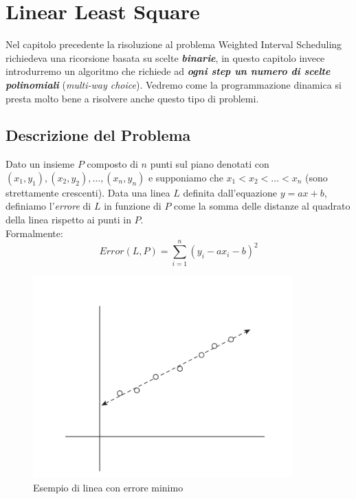 \chapter{Linear Least Square}

Nel capitolo precedente la risoluzione al problema Weighted Interval
Scheduling richiedeva una ricorsione basata su scelte
\textbf{\emph{binarie}}, in questo capitolo invece introdurremo un
algoritmo che richiede ad \textbf{\emph{ogni step un numero di scelte
    polinomiali}} (\emph{multi-way choice}). Vedremo come la programmazione
dinamica si presta molto bene a risolvere anche questo tipo di problemi.

\section{Descrizione del Problema}

\begin{myblockquote}
  Dato un insieme $P$ composto di $n$ punti sul piano denotati con \linebreak
  $(x_1, y_1), (x_2, y_2), \ldots, (x_n, y_n)$ e supponiamo che
  $x_1 < x_2 < \ldots < x_n$ (sono strettamente crescenti). Data una
  linea $L$ definita dall'equazione $y = ax + b$, definiamo
  l'\emph{errore} di $L$ in funzione di $P$ come la somma delle
  distanze al quadrato della linea rispetto ai punti in $P$.\\

  Formalmente:
  \begin{equation*}
    Error(L, P) = \sum_{i=1}^{n} (y_i - ax_i - b)^2
  \end{equation*}
\end{myblockquote}

\begin{figure}[H]
  \centering
  \includegraphics[width = 10cm, keepaspectratio]{capitoli/programmazione_dinamica/imgs/best_fit.png}
  \caption{Esempio di linea con errore minimo}
\end{figure}

